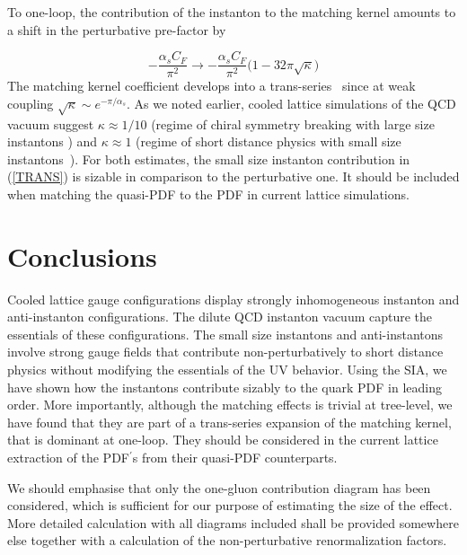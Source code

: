 \documentclass[11pt,aps,amsmath,amssymb,nofootinbib,notitlepage,longbibliography]{revtex4-1}
\newcommand{\be}{\begin{equation}}
\newcommand{\ee}{\end{equation}}
\begin{document}
To one-loop, the contribution of the instanton to the matching kernel amounts to a shift in the perturbative pre-factor by

\be
\label{TRANS}
-\frac{\alpha_s C_F}{\pi^2}\rightarrow -\frac{\alpha_s C_F}{\pi^2}\bigg(1-32\pi\sqrt\kappa\bigg)
\ee
The matching kernel coefficient develops into a trans-series~\cite{Dunne:2013ada} since at weak coupling $\sqrt\kappa\sim e^{-\pi/\alpha_s}$. As we noted earlier,
cooled lattice simulations of the QCD vacuum suggest $\kappa\approx 1/10$ (regime of chiral symmetry breaking with large size instantons \cite{Schafer:1996wv})
and $\kappa\approx 1$  (regime of short distance physics with small size instantons~\cite{Athenodorou:2018jwu}).  For both estimates, the small size
instanton contribution in  (\ref{TRANS})  is sizable in comparison to the perturbative one. It should be included when matching the quasi-PDF to the PDF in current lattice simulations.





\section{Conclusions}
\label{sec_conclusions}


Cooled lattice gauge configurations display strongly inhomogeneous instanton and anti-instanton configurations. The dilute QCD instanton vacuum
capture the essentials of these configurations. The small size instantons and anti-instantons involve strong gauge fields that contribute non-perturbatively
to short distance physics without modifying the essentials of the UV behavior. Using the SIA, we have
shown how the instantons contribute sizably to the quark PDF in leading order. More importantly, although the matching effects is trivial at tree-level, we have found that they are part of a trans-series expansion of the matching kernel, that is dominant at one-loop. They should be considered in the current lattice extraction of the PDF$^\prime$s from their quasi-PDF counterparts.

We should emphasise that only the one-gluon contribution diagram has been considered, which is sufficient for our purpose of estimating the size of the effect. More detailed calculation with all diagrams included shall be provided somewhere else together with a calculation of the non-perturbative renormalization factors.
\end{document}
